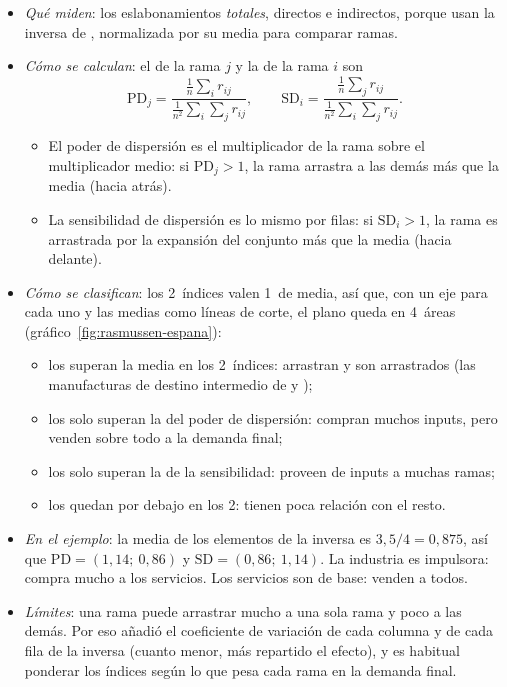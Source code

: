 \documentclass[11pt]{article}
\begin{document}
\begin{itemize}
\item \emph{Qué miden}: los eslabonamientos \emph{totales}, directos e indirectos, porque usan la inversa de , normalizada por su media para comparar ramas\nocite{Rasmussen1956Studies}.
\item \emph{Cómo se calculan}: el  de la rama $j$ y la  de la rama $i$ son
\begin{equation}\label{eq:rasmussen}
\mathrm{PD}_j=\frac{\frac{1}{n}\sum_i r_{ij}}{\frac{1}{n^2}\sum_i\sum_j r_{ij}},\qquad \mathrm{SD}_i=\frac{\frac{1}{n}\sum_j r_{ij}}{\frac{1}{n^2}\sum_i\sum_j r_{ij}}.
\end{equation}
  \begin{itemize}
  \item El poder de dispersión es el multiplicador de la rama sobre el multiplicador medio: si $\mathrm{PD}_j>1$, la rama arrastra a las demás más que la media (hacia atrás).
  \item La sensibilidad de dispersión es lo mismo por filas: si $\mathrm{SD}_i>1$, la rama es arrastrada por la expansión del conjunto más que la media (hacia delante).
  \end{itemize}
\item \emph{Cómo se clasifican}: los 2~índices valen 1~de media, así que, con un eje para cada uno y las medias como líneas de corte, el plano queda en 4~áreas (gráfico~\ref{fig:rasmussen-espana}):
  \begin{itemize}
  \item los  superan la media en los 2~índices: arrastran y son arrastrados (las manufacturas de destino intermedio de  y );
  \item los  solo superan la del poder de dispersión: compran muchos inputs, pero venden sobre todo a la demanda final;
  \item los  solo superan la de la sensibilidad: proveen de inputs a muchas ramas;
  \item los  quedan por debajo en los 2: tienen poca relación con el resto.
  \end{itemize}
\item \emph{En el ejemplo}: la media de los elementos de la inversa es $3{,}5/4=0{,}875$, así que $\mathrm{PD}=(1{,}14;\ 0{,}86)$ y $\mathrm{SD}=(0{,}86;\ 1{,}14)$. La industria es impulsora: compra mucho a los servicios. Los servicios son de base: venden a todos.
\item \emph{Límites}: una rama puede arrastrar mucho a una sola rama y poco a las demás. Por eso  añadió el coeficiente de variación de cada columna y de cada fila de la inversa (cuanto menor, más repartido el efecto), y es habitual ponderar los índices según lo que pesa cada rama en la demanda final.
\end{itemize}
\end{document}
